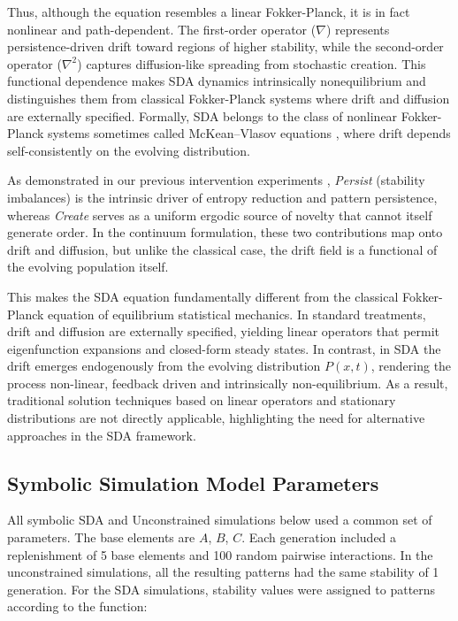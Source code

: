 \documentclass[life,article,submit,pdftex,moreauthors]{Definitions/mdpi}
\begin{document}
Thus, although the equation resembles a linear Fokker-Planck, it is in fact nonlinear and path-dependent. 
The first-order operator ($\nabla$) represents persistence-driven drift toward regions of higher stability, 
while the second-order operator ($\nabla^2$) captures diffusion-like spreading from stochastic creation. 
This functional dependence makes SDA dynamics intrinsically nonequilibrium and distinguishes them from 
classical Fokker-Planck systems where drift and diffusion are externally specified. 
Formally, SDA belongs to the class of nonlinear Fokker-Planck systems sometimes called McKean--Vlasov equations \cite{mckean1966, villani2009}, 
where drift depends self-consistently on the evolving distribution.  

As demonstrated in our previous intervention experiments \cite{adler_sda}, 
\textit{Persist} (stability imbalances) is the intrinsic driver of entropy
reduction and pattern persistence, whereas \textit{Create} serves as a uniform ergodic source of novelty that cannot itself generate order.  
In the continuum formulation, these two contributions map onto drift and diffusion, 
but unlike the classical case, the drift field is a functional of the evolving
population itself.  

This makes the SDA equation fundamentally different from the classical Fokker-Planck equation of equilibrium statistical mechanics. In standard treatments, 
drift and diffusion are externally specified, yielding linear operators that
permit eigenfunction expansions and closed-form steady states. In contrast,
in SDA the drift emerges endogenously from the evolving distribution $P(x,t)$, 
rendering the process non-linear, feedback driven and intrinsically non-equilibrium.  
As a result, traditional solution techniques based on linear operators and
stationary distributions are not directly applicable, highlighting the need
for alternative approaches in the SDA framework.


\subsection{Symbolic Simulation Model Parameters}

All symbolic SDA and Unconstrained simulations below used a common set of parameters. The base elements are $A$, $B$, $C$.
Each generation included
a replenishment of 5 base elements and 100 random pairwise
interactions. In the unconstrained simulations, all the resulting patterns had the same stability of 1 generation. For the SDA simulations, 
stability values were assigned to patterns according to the
function:
\end{document}
